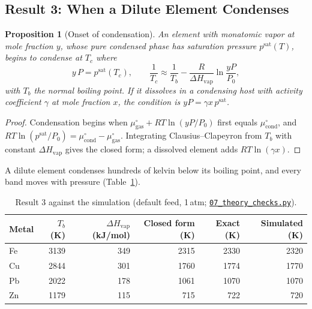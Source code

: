 \documentclass[11pt,a4paper]{article}
\newcommand{\gh}[2]{\href{https://github.com/syncaissa/paramanu-reclaimer/blob/main/#1}{\texttt{#2}}}
\theoremstyle{definition}
\theoremstyle{plain}
\newtheorem{proposition}{Proposition}[section]
\theoremstyle{remark}
\begin{document}
\subsection{Result 3: When a Dilute Element Condenses}
\begin{proposition}[Onset of condensation]\label{prop:onset}
An element with monatomic vapor at mole fraction $y$, whose pure condensed phase has saturation pressure $p^{\mathrm{sat}}(T)$, begins to condense at $T_c$ where
\begin{equation}\label{eq:onset}
y\,P = p^{\mathrm{sat}}(T_c), \qquad \frac{1}{T_c} \approx \frac{1}{T_b} - \frac{R}{\Delta H_{\mathrm{vap}}}\ln\frac{yP}{P_0},
\end{equation}
with $T_b$ the normal boiling point. If it dissolves in a condensing host with activity coefficient $\gamma$ at mole fraction $x$, the condition is $yP = \gamma x\,p^{\mathrm{sat}}$.
\end{proposition}
\begin{proof}
Condensation begins when $\mu^\circ_{\mathrm{gas}} + RT\ln(yP/P_0)$ first equals $\mu^\circ_{\mathrm{cond}}$, and $RT\ln(p^{\mathrm{sat}}/P_0) = \mu^\circ_{\mathrm{cond}} - \mu^\circ_{\mathrm{gas}}$. Integrating Clausius--Clapeyron from $T_b$ with constant $\Delta H_{\mathrm{vap}}$ gives the closed form; a dissolved element adds $RT\ln(\gamma x)$.
\end{proof}
A dilute element condenses hundreds of kelvin below its boiling point, and every band moves with pressure (Table~\ref{tab:onset}).

\begin{table}[!htbp]
\centering
\caption{Result 3 against the simulation (default feed, 1\,atm; \gh{simulation/scripts/07_theory_checks.py}{07\_theory\_checks.py}).}\label{tab:onset}
\footnotesize
\begin{tabular}{@{}lrrrrr@{}}
\toprule
\textbf{Metal} & \textbf{$T_b$ (K)} & \textbf{$\Delta H_{\mathrm{vap}}$ (kJ/mol)} & \textbf{Closed form (K)} & \textbf{Exact (K)} & \textbf{Simulated (K)} \\
\midrule
Fe & 3139 & 349 & 2315 & 2330 & 2320 \\
Cu & 2844 & 301 & 1760 & 1774 & 1770 \\
Pb & 2022 & 178 & 1061 & 1070 & 1070 \\
Zn & 1179 & 115 & 715 & 722 & 720 \\
\bottomrule
\end{tabular}
\end{table}
\end{document}

